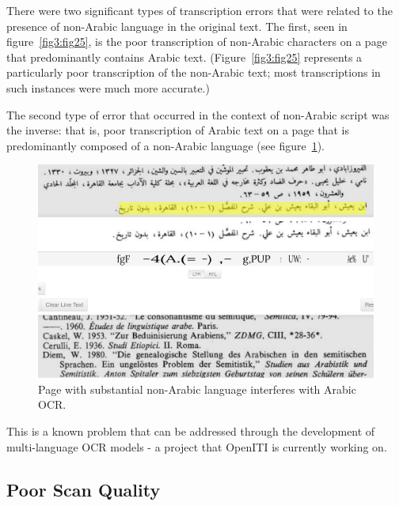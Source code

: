There were two significant types of transcription errors that were related to
the presence of non-Arabic language in the original text. The first, seen in
figure~\ref{fig3:fig25}, is the poor transcription of non-Arabic characters on a
page that predominantly contains Arabic text. (Figure~\ref{fig3:fig25}
represents a particularly poor transcription of the non-Arabic text; most
transcriptions in such instances were much more accurate.)
  
The second type of error that occurred in the context of non-Arabic script was
the inverse: that is, poor transcription of Arabic text on a page that is
predominantly composed of a non-Arabic language (see figure~\ref{fig3:fig26}). 

\begin{figure}[H]
	\centering
	\includegraphics[width=0.7\linewidth]{images/image13.png}
	\caption{Page with substantial non-Arabic language interferes with Arabic OCR.}
	\label{fig3:fig26}
\end{figure}
 
This is a known problem that can be addressed through the development of
multi-language OCR models - a project that OpenITI is currently working on.

\subsection{Poor Scan Quality}

